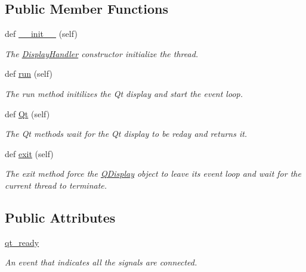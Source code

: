 \subsection*{Public Member Functions}
\begin{DoxyCompactItemize}
\item 
def \hyperlink{classDQN-Deepmind-NIPS-2013_1_1QtDisplay_1_1DisplayHandler_a417807e1b454c0cc3e86a8bddb2e6aee}{\+\_\+\+\_\+init\+\_\+\+\_\+} (self)
\begin{DoxyCompactList}\small\item\em The \hyperlink{classDQN-Deepmind-NIPS-2013_1_1QtDisplay_1_1DisplayHandler}{Display\+Handler} constructor initialize the thread. \end{DoxyCompactList}\item 
def \hyperlink{classDQN-Deepmind-NIPS-2013_1_1QtDisplay_1_1DisplayHandler_a1f995b71cfad970a33d358737a90970a}{run} (self)
\begin{DoxyCompactList}\small\item\em The run method initilizes the Qt display and start the event loop. \end{DoxyCompactList}\item 
def \hyperlink{classDQN-Deepmind-NIPS-2013_1_1QtDisplay_1_1DisplayHandler_a1c18d34e62cbeff7c6d75a8eeb02506b}{Qt} (self)
\begin{DoxyCompactList}\small\item\em The Qt methods wait for the Qt display to be reday and returns it. \end{DoxyCompactList}\item 
def \hyperlink{classDQN-Deepmind-NIPS-2013_1_1QtDisplay_1_1DisplayHandler_a9f10007a3cf4bfdf8b3908f57ef03b7b}{exit} (self)
\begin{DoxyCompactList}\small\item\em The exit method force the \hyperlink{classDQN-Deepmind-NIPS-2013_1_1QtDisplay_1_1QDisplay}{Q\+Display} object to leave its event loop and wait for the current thread to terminate. \end{DoxyCompactList}\end{DoxyCompactItemize}
\subsection*{Public Attributes}
\begin{DoxyCompactItemize}
\item 
\hyperlink{classDQN-Deepmind-NIPS-2013_1_1QtDisplay_1_1DisplayHandler_a5c3b4122e47a768cd3ef67f478ee25c0}{qt\+\_\+ready}
\begin{DoxyCompactList}\small\item\em An event that indicates all the signals are connected. \end{DoxyCompactList}\end{DoxyCompactItemize}


